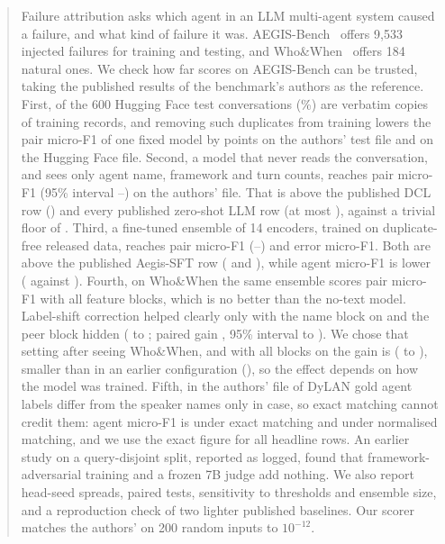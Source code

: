 \documentclass[conference]{IEEEtran}
\begin{document}
\begin{abstract}
Failure attribution asks which agent in an LLM multi-agent system caused a failure, and what kind of failure it was. AEGIS-Bench~\cite{aegis} offers 9,533 injected failures for training and testing, and Who\&When~\cite{whowhen} offers 184 natural ones. We check how far scores on AEGIS-Bench can be trusted, taking the published results of the benchmark's authors as the reference. First, \dupTrain{} of the 600 Hugging Face test conversations (\dupTrainPct\%) are verbatim copies of training records, and removing such duplicates from training lowers the pair micro-F1 of one fixed model by \dropAE{} points on the authors' test file and \dropHF{} on the Hugging Face file. Second, a model that never reads the conversation, and sees only agent name, framework and turn counts, reaches \shortAEpair{} pair micro-F1 (95\% interval \shortAEpairLo--\shortAEpairHi) on the authors' file. That is above the published DCL row (\pubDCL) and every published zero-shot LLM row (at most \pubOthree), against a trivial floor of \floorAE. Third, a fine-tuned ensemble of 14 encoders, trained on duplicate-free released data, reaches \ensAEpair{} pair micro-F1 (\ensAEpairLo--\ensAEpairHi) and \ensAEerror{} error micro-F1. Both are above the published Aegis-SFT row (\pubSFT{} and \pubSFTerror), while agent micro-F1 is lower (\ensAEagent{} against \pubSFTagent). Fourth, on Who\&When the same ensemble scores \wwAllNo{} pair micro-F1 with all feature blocks, which is no better than the no-text model. Label-shift correction helped clearly only with the name block on and the peer block hidden (\wwNameNo{} to \wwNameShift; paired gain \sgDdOF{}, 95\% interval \sgDdOFLo{} to \sgDdOFHi{}). We chose that setting after seeing Who\&When, and with all blocks on the gain is \sgDdOO{} (\sgDdOOLo{} to \sgDdOOHi{}), smaller than in an earlier configuration (\sgOldOO{}), so the effect depends on how the model was trained. Fifth, in the authors' file \nmDyMis{} of \nmDyTot{} DyLAN gold agent labels differ from the speaker names only in case, so exact matching cannot credit them: agent micro-F1 is \nmAgentExact{} under exact matching and \nmAgentNorm{} under normalised matching, and we use the exact figure for all headline rows. An earlier study on a query-disjoint split, reported as logged, found that framework-adversarial training and a frozen 7B judge add nothing. We also report head-seed spreads, paired tests, sensitivity to thresholds and ensemble size, and a reproduction check of two lighter published baselines. Our scorer matches the authors' on 200 random inputs to $10^{-12}$.
\end{abstract}
\end{document}
